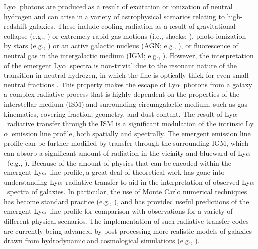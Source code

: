 \documentclass{emulateapj}
\newcommand{\lya}{Ly$\alpha$}
\begin{document}
\lya\ photons are produced as a result of excitation or ionization of neutral hydrogen and can arise in a variety of astrophysical scenarios relating to high-redshift galaxies. These include cooling radiation as a result of gravitational collapse (e.g., \citealp{faucher-giguere2010}) or extremely rapid gas motions (i.e., shocks; \citealp{birnboim2003}), photo-ionization by stars (e.g., \citealp{partridge1967}) or an active galactic nucleus (AGN; e.g., \citealp{haiman2001}), or fluorescence of neutral gas in the intergalactic medium (IGM; e.g., \citealp{kollmeier2010}). However, the interpretation of the emergent \lya\ spectra is non-trivial due to the resonant nature of the transition in neutral hydrogen, in which the line is optically thick for even small neutral fractions \citep{gunn1965}. This property makes the escape of \lya\ photons from a galaxy a complex radiative process that is highly dependent on the properties of the interstellar medium (ISM) and surrounding circumgalactic medium, such as gas kinematics, covering fraction, geometry, and dust content. The result of \lya\ radiative transfer through the ISM is a significant modulation of the intrinsic \lya\ emission line profile, both spatially and spectrally. The emergent emission line profile can be further modified by transfer through the surrounding IGM, which can absorb a significant amount of radiation in the vicinity and blueward of \lya\ (e.g., \citealp{laursen2011}). Because of the amount of physics that can be encoded within the emergent \lya\ line profile, a great deal of theoretical work has gone into understanding \lya\ radiative transfer to aid in the interpretation of observed \lya\ spectra of galaxies. In particular, the use of Monte Carlo numerical techniques has become standard practice (e.g., \citealp{lee1974,ahn2000,zheng2002,tasitsiomi2006,hansen2006,dijkstra2006a,verhamme2006}), and has provided useful predictions of the emergent \lya\ line profile for comparison with observations for a variety of different physical scenarios. The implementation of such radiative transfer codes are currently being advanced by post-processing more realistic models of galaxies drawn from hydrodynamic and cosmological simulations (e.g., \citealp{zheng2010,kollmeier2010,barnes2011,verhamme2012,yajima2012}).
\end{document}
